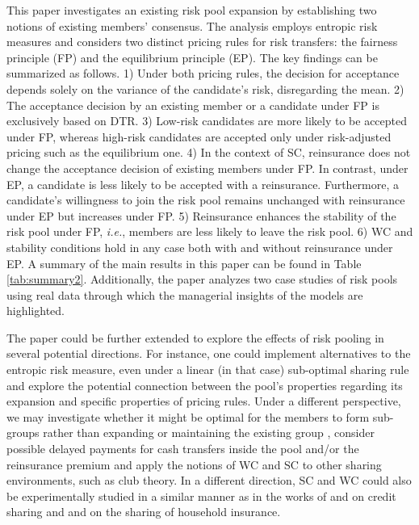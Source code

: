 \documentclass[fleqn,mnsc,nonblindrev]{informs4}
\begin{document}
   {This paper investigates an existing risk pool expansion by establishing two notions of existing members' consensus. The analysis employs entropic risk measures and considers two distinct pricing rules for risk transfers:} the fairness principle (FP) and the equilibrium principle (EP). The key findings can be summarized as follows. 1) Under both pricing rules, the decision for acceptance depends solely on the variance of the candidate's risk, disregarding the mean. 2) The acceptance decision by an existing member or a candidate under FP is exclusively based on DTR. 3) Low-risk candidates are more likely to be accepted under FP, whereas high-risk candidates are accepted only under risk-adjusted pricing such as the equilibrium one. 4) In the context of SC, reinsurance does not change the acceptance decision of existing members under FP. In contrast, under EP, a candidate is less likely to be accepted with a reinsurance. Furthermore, a candidate's willingness to join the risk pool remains unchanged with reinsurance under EP but increases under FP. 5) Reinsurance enhances the stability of the risk pool under FP, {\it i.e.}, members are less likely to leave the risk pool. 6) WC and stability conditions hold in any case both with and without reinsurance under EP. A summary of the main results in this paper can be found in Table \ref{tab:summary2}.    {Additionally, the paper analyzes two case studies of risk pools using real data through which the managerial insights of the models are highlighted.} 

The paper   {could} be further extended to   {explore} the effects of risk pooling   {in} several potential directions.   {For instance, one could implement} alternatives to the entropic risk measure, even under a linear (in that case) sub-optimal sharing rule and   {explore the potential} connection between the pool's properties regarding its expansion   {and} specific properties of pricing rules.   {Under a different perspective, we may investigate whether it might} be optimal for the members to form sub-groups rather than expanding or maintaining the existing group   {, consider possible delayed payments for cash transfers inside the pool and/or the reinsurance premium and apply the notions of WC and SC to other sharing environments, such as club theory. In a different direction, SC and WC could also be experimentally studied
in a similar manner as in the works of \cite{Ahlin20} and \cite{CarpeSadou00} on credit sharing and \cite{Rob12} and \cite{AmbMobSze14} on the sharing of household insurance.}
\end{document}
